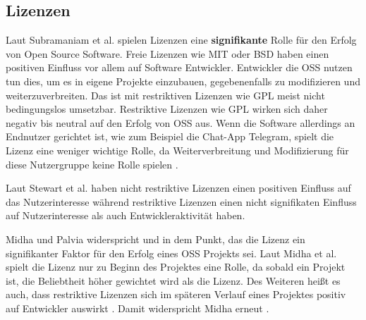 \subsection{Lizenzen}



Laut Subramaniam et al. spielen Lizenzen eine \textbf{signifikante} Rolle für den Erfolg von 
Open Source Software.
Freie Lizenzen wie MIT oder BSD haben einen positiven Einfluss vor allem auf Software Entwickler.
Entwickler die OSS nutzen tun dies, um es in eigene Projekte einzubauen, gegebenenfalls zu modifizieren
und weiterzuverbreiten. Das ist mit restriktiven Lizenzen wie GPL meist nicht bedingungslos umsetzbar.
Restriktive Lizenzen wie GPL wirken sich daher negativ bis neutral auf den Erfolg von OSS aus.
Wenn die Software allerdings an Endnutzer
gerichtet ist, wie zum Beispiel die Chat-App Telegram, spielt die Lizenz eine weniger wichtige Rolle, 
da Weiterverbreitung und Modifizierung für diese Nutzergruppe keine Rolle spielen 
\cite{subramaniamDeterminantsOpenSource2009}.

Laut Stewart et al. haben nicht restriktive Lizenzen
einen positiven Einfluss auf das Nutzerinteresse %
während restriktive Lizenzen einen nicht signifikaten Einfluss auf Nutzerinteresse
als auch Entwickleraktivität haben.


Midha und Palvia widerspricht \cite{stewartImpactsLicenseChoice2006a} und \cite{subramaniamDeterminantsOpenSource2009} 
in dem Punkt, das die Lizenz ein signifikanter Faktor für den Erfolg eines OSS Projekts sei.
Laut Midha et al. spielt die Lizenz nur zu Beginn
des Projektes eine Rolle, da sobald ein Projekt  ist, die Beliebtheit höher gewichtet wird als
die Lizenz.
Des Weiteren heißt es auch, dass restriktive Lizenzen sich im späteren Verlauf eines Projektes positiv
auf Entwickler auswirkt \cite{midhaFactorsAffectingSuccess2012}. %
Damit widerspricht Midha erneut \cite{stewartImpactsLicenseChoice2006a}.

